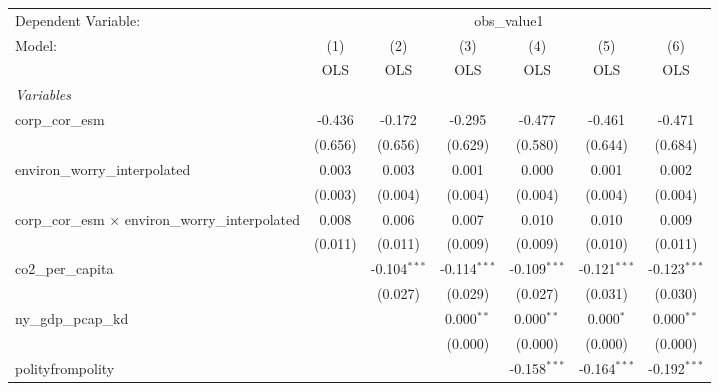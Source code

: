 
\begingroup
\centering
\begin{tabular}{lcccccc}
   \toprule
   Dependent Variable: & \multicolumn{6}{c}{obs\_value1}\\
   Model:                                                    & (1)     & (2)            & (3)            & (4)            & (5)            & (6)\\  
                                                             &  OLS    & OLS            & OLS            & OLS            & OLS            & OLS\\  
   \midrule
   \emph{Variables}\\
   corp\_cor\_esm                                            & -0.436  & -0.172         & -0.295         & -0.477         & -0.461         & -0.471\\   
                                                             & (0.656) & (0.656)        & (0.629)        & (0.580)        & (0.644)        & (0.684)\\   
   environ\_worry\_interpolated                              & 0.003   & 0.003          & 0.001          & 0.000          & 0.001          & 0.002\\   
                                                             & (0.003) & (0.004)        & (0.004)        & (0.004)        & (0.004)        & (0.004)\\   
   corp\_cor\_esm $\times$ environ\_worry\_interpolated      & 0.008   & 0.006          & 0.007          & 0.010          & 0.010          & 0.009\\   
                                                             & (0.011) & (0.011)        & (0.009)        & (0.009)        & (0.010)        & (0.011)\\   
   co2\_per\_capita                                          &         & -0.104$^{***}$ & -0.114$^{***}$ & -0.109$^{***}$ & -0.121$^{***}$ & -0.123$^{***}$\\   
                                                             &         & (0.027)        & (0.029)        & (0.027)        & (0.031)        & (0.030)\\   
   ny\_gdp\_pcap\_kd                                         &         &                & 0.000$^{**}$   & 0.000$^{**}$   & 0.000$^{*}$    & 0.000$^{**}$\\   
                                                             &         &                & (0.000)        & (0.000)        & (0.000)        & (0.000)\\   
   polityfrompolity                                          &         &                &                & -0.158$^{***}$ & -0.164$^{***}$ & -0.192$^{***}$\\   

\end{tabular}
